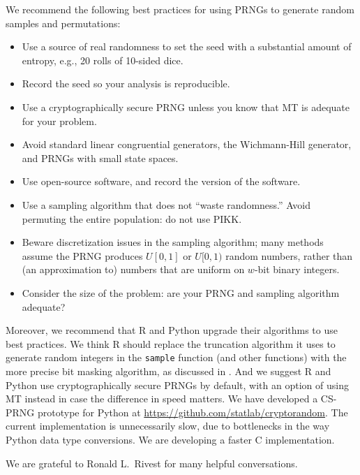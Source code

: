 \documentclass[graybox]{svmult}
\begin{document}
We recommend the following best practices for using PRNGs to generate random samples and permutations:
\begin{itemize}
\item Use a source of real randomness to set the seed with a substantial amount of entropy, e.g., 20 rolls of 10-sided dice.
\item Record the seed so your analysis is reproducible.
\item Use a cryptographically secure PRNG unless you know that MT is adequate for your problem.
\item Avoid standard linear congruential generators, the Wichmann-Hill generator, and PRNGs with small state spaces.
\item Use open-source software, and record the version of the software.
\item Use a sampling algorithm that does not ``waste randomness.'' Avoid permuting the entire population: do not use PIKK.
\item Beware discretization issues in the sampling algorithm; many methods assume the PRNG produces $U[0,1]$ or $U[0,1)$ random numbers, rather than (an approximation to) numbers that are uniform on $w$-bit binary integers.
\item Consider the size of the problem: are your PRNG and sampling algorithm adequate?
\end{itemize}


Moreover, we recommend that R and Python upgrade their algorithms to use best practices.
We think R should replace the truncation algorithm it uses to generate random integers in the \texttt{sample} function (and other functions) with the more precise bit masking algorithm, as discussed
in \cite{ottoboniStark18}.
And we suggest R and Python use cryptographically secure PRNGs by default, with an option of using MT instead in case the difference in speed matters.
We have developed a CS-PRNG prototype for Python at \url{https://github.com/statlab/cryptorandom}.
The current implementation is unnecessarily slow, due to bottlenecks in the way Python data type
conversions. 
We are developing a faster C implementation.



\begin{acknowledgement}
We are grateful to Ronald L.~Rivest for many helpful conversations.
\end{acknowledgement}




\end{document}
